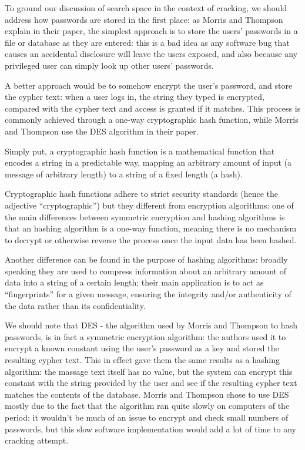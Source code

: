 To ground our discussion of search space in the context of cracking, we should address how passwords are stored in the first place: as Morris and Thompson explain in their paper, the simplest approach is to store the users' passwords in a file or database as they are entered: this is a bad idea as any software bug that causes an accidental disclosure will leave the users exposed, and also because any privileged user can simply look up other users' passwords.

A better approach would be to somehow encrypt the user's password, and store the cypher text: when a user logs in, the string they typed is encrypted, compared with the cypher text and access is granted if it matches. This process is commonly achieved through a one-way cryptographic hash function, while Morris and Thompson use the DES algorithm in their paper.

Simply put, a cryptographic hash function is a mathematical function that encodes a string in a predictable way, mapping an arbitrary amount of input (a message of arbitrary length) to a string of a fixed length (a hash). 

Cryptographic hash functions adhere to strict security standards (hence the adjective \enquote{cryptographic}) but they different from encryption algorithms: %
one of the main differences between symmetric encryption and hashing algorithms is that an hashing algorithm is a one-way function, meaning there is no mechanism to decrypt or otherwise reverse the process once the input data has been hashed. 

Another difference can be found in the purpose of hashing algorithms: broadly speaking they are used to compress information about an arbitrary amount of data into a string of a certain length; their main application is to act as \enquote{fingerprints} for a given message, ensuring the integrity and/or authenticity of the data rather than its confidentiality.

We should note that DES - the algorithm used by Morris and Thompson \cite{Thompson1979} to hash passwords, is in fact a symmetric encryption algorithm: the authors used it to encrypt a known constant using the user's password as a key and stored the resulting cypher text.
This in effect gave them the same results as a hashing algorithm: the massage text itself has no value, but the system can encrypt this constant with the string provided by the user and see if the resulting cypher text matches the contents of the database.
Morris and Thompson chose to use DES mostly due to the fact that the algorithm ran quite slowly on computers of the period: it wouldn't be much of an issue to encrypt and check small numbers of passwords, but this slow software implementation would add a lot of time to any cracking attempt.

